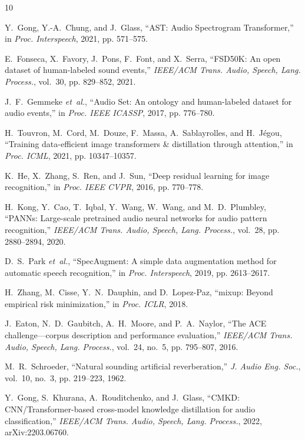 \documentclass[11pt,a4paper]{article}
\begin{document}
\begin{itemize}
\end{itemize}

\begin{thebibliography}{10}

Y.~Gong, Y.-A.~Chung, and J.~Glass, ``AST: Audio Spectrogram Transformer,'' in \emph{Proc. Interspeech}, 2021, pp. 571--575.

E.~Fonseca, X.~Favory, J.~Pons, F.~Font, and X.~Serra, ``FSD50K: An open dataset of human-labeled sound events,'' \emph{IEEE/ACM Trans. Audio, Speech, Lang. Process.}, vol.~30, pp. 829--852, 2021.

J.~F.~Gemmeke \emph{et~al.}, ``Audio Set: An ontology and human-labeled dataset for audio events,'' in \emph{Proc. IEEE ICASSP}, 2017, pp. 776--780.

H.~Touvron, M.~Cord, M.~Douze, F.~Massa, A.~Sablayrolles, and H.~J{\'e}gou, ``Training data-efficient image transformers \& distillation through attention,'' in \emph{Proc. ICML}, 2021, pp. 10347--10357.

K.~He, X.~Zhang, S.~Ren, and J.~Sun, ``Deep residual learning for image recognition,'' in \emph{Proc. IEEE CVPR}, 2016, pp. 770--778.

H.~Kong, Y.~Cao, T.~Iqbal, Y.~Wang, W.~Wang, and M.~D.~Plumbley, ``PANNs: Large-scale pretrained audio neural networks for audio pattern recognition,'' \emph{IEEE/ACM Trans. Audio, Speech, Lang. Process.}, vol.~28, pp. 2880--2894, 2020.

D.~S.~Park \emph{et~al.}, ``SpecAugment: A simple data augmentation method for automatic speech recognition,'' in \emph{Proc. Interspeech}, 2019, pp. 2613--2617.

H.~Zhang, M.~Cisse, Y.~N.~Dauphin, and D.~Lopez-Paz, ``mixup: Beyond empirical risk minimization,'' in \emph{Proc. ICLR}, 2018.

J.~Eaton, N.~D.~Gaubitch, A.~H.~Moore, and P.~A.~Naylor, ``The ACE challenge---corpus description and performance evaluation,'' \emph{IEEE/ACM Trans. Audio, Speech, Lang. Process.}, vol.~24, no.~5, pp. 795--807, 2016.

M.~R.~Schroeder, ``Natural sounding artificial reverberation,'' \emph{J. Audio Eng. Soc.}, vol.~10, no.~3, pp. 219--223, 1962.

Y.~Gong, S.~Khurana, A.~Rouditchenko, and J.~Glass, ``CMKD: CNN/Transformer-based cross-model knowledge distillation for audio classification,'' \emph{IEEE/ACM Trans. Audio, Speech, Lang. Process.}, 2022, arXiv:2203.06760.

\end{thebibliography}
\end{document}
